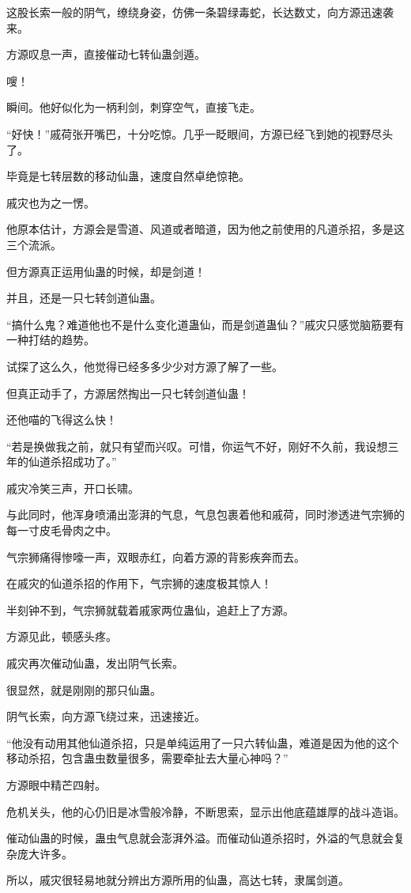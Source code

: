 \begin{this_body}
这股长索一般的阴气，缭绕身姿，仿佛一条碧绿毒蛇，长达数丈，向方源迅速袭来。

方源叹息一声，直接催动七转仙蛊剑遁。

嗖！

瞬间。他好似化为一柄利剑，刺穿空气，直接飞走。

“好快！”戚荷张开嘴巴，十分吃惊。几乎一眨眼间，方源已经飞到她的视野尽头了。

毕竟是七转层数的移动仙蛊，速度自然卓绝惊艳。

戚灾也为之一愣。

他原本估计，方源会是雪道、风道或者暗道，因为他之前使用的凡道杀招，多是这三个流派。

但方源真正运用仙蛊的时候，却是剑道！

并且，还是一只七转剑道仙蛊。

“搞什么鬼？难道他也不是什么变化道蛊仙，而是剑道蛊仙？”戚灾只感觉脑筋要有一种打结的趋势。

试探了这么久，他觉得已经多多少少对方源了解了一些。

但真正动手了，方源居然掏出一只七转剑道仙蛊！

还他喵的飞得这么快！

“若是换做我之前，就只有望而兴叹。可惜，你运气不好，刚好不久前，我设想三年的仙道杀招成功了。”

戚灾冷笑三声，开口长啸。

与此同时，他浑身喷涌出澎湃的气息，气息包裹着他和戚荷，同时渗透进气宗狮的每一寸皮毛骨肉之中。

气宗狮痛得惨嚎一声，双眼赤红，向着方源的背影疾奔而去。

在戚灾的仙道杀招的作用下，气宗狮的速度极其惊人！

半刻钟不到，气宗狮就载着戚家两位蛊仙，追赶上了方源。

方源见此，顿感头疼。

戚灾再次催动仙蛊，发出阴气长索。

很显然，就是刚刚的那只仙蛊。

阴气长索，向方源飞绕过来，迅速接近。

“他没有动用其他仙道杀招，只是单纯运用了一只六转仙蛊，难道是因为他的这个移动杀招，包含蛊虫数量很多，需要牵扯去大量心神吗？”

方源眼中精芒四射。

危机关头，他的心仍旧是冰雪般冷静，不断思索，显示出他底蕴雄厚的战斗造诣。

催动仙蛊的时候，蛊虫气息就会澎湃外溢。而催动仙道杀招时，外溢的气息就会复杂庞大许多。

所以，戚灾很轻易地就分辨出方源所用的仙蛊，高达七转，隶属剑道。


\end{this_body}
